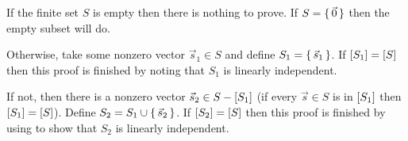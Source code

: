 \begin{exercises}
\begin{answer}
\begin{exparts}
           If the finite set \( S \) is empty then there is nothing to prove.
           If \( S=\mbox{$\{\,\vec{0}\,\}$} \) then the empty subset will do.

           Otherwise, take some nonzero vector \( \vec{s}_1\in S \)
           and define \( S_1=\mbox{$\{\,\vec{s}_1\,\}$} \).
           If \( \relax [S_1\relax ]=\relax [S\relax ] \) then
           this proof is finished by noting that \( S_1 \) is linearly
           independent.

           If not, then there is a nonzero
           vector \( \vec{s}_2\in S-\relax [S_1\relax ] \)
           (if every \( \vec{s}\in S \) is in \( \relax [S_1\relax ] \) then
           \( \relax [S_1\relax ]=\relax [S\relax ] \)).
           Define \( S_2=S_1\cup\mbox{$\{\,\vec{s}_2\,\}$} \).
           If \( \relax [S_2\relax ]=\relax [S\relax ] \) then
           this proof is finished by using 
           to show that \( S_2 \) is linearly independent.


\end{exparts}
\end{answer}
\end{exercises}
